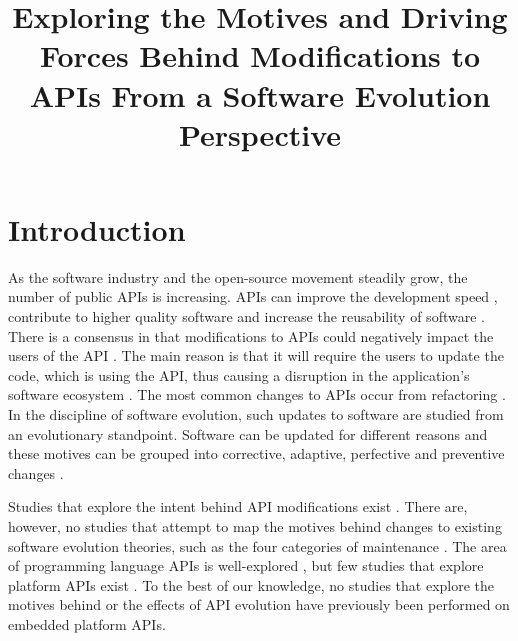 \documentclass[conference]{IEEEtran}
\begin{document}
\title{Exploring the Motives and Driving Forces Behind Modifications to APIs From a Software Evolution Perspective}

\author{
 \and
{}
}

\maketitle


\begin{abstract}
\blindtext
\end{abstract}


\section{Introduction} \label{introduction}
As the software industry and the open-source movement steadily grow, the number of public APIs is increasing. APIs can improve the development speed \cite{stylos2006comparing}, contribute to higher quality software \cite{stylos2006comparing} and increase the reusability of software \cite{afonso2012evaluating}. There is a consensus in that modifications to APIs could negatively impact the users of the API \cite{google_talk} \cite{mcdonnell2013empirical} \cite{robbes2012developers} \cite{henning2007api}. The main reason is that it will require the users to update the code, which is using the API, thus causing a disruption in the application's software ecosystem \cite{messerschmitt2005software}. The most common changes to APIs occur from refactoring \cite{dig2005role} \cite{xing2006refactoring}. 
In the discipline of software evolution, such updates to software are studied from an evolutionary standpoint. Software can be updated for different reasons and these motives can be grouped into corrective, adaptive, perfective and preventive changes \cite{lientz1980software}. 

Studies that explore the intent behind API modifications exist \cite{hou2011exploring}. There are, however, no studies that attempt to map the motives behind changes to existing software evolution theories, such as the four categories of maintenance \cite{lientz1980software}. The area of programming language APIs is well-explored \cite{hou2011exploring} \cite{shi2011empirical}, but few studies that explore platform APIs exist \cite{robbes2012developers}. To the best of our knowledge, no studies that explore the motives behind or the effects of API evolution have previously been performed on embedded platform APIs. 
\end{document}
